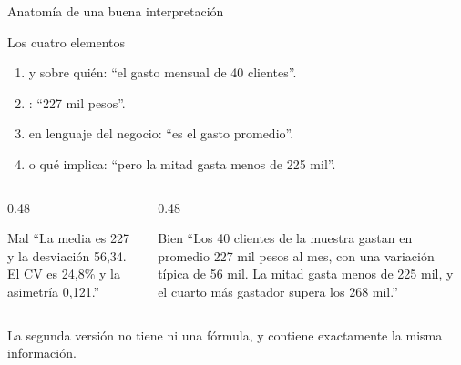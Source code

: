 \documentclass[aspectratio=169,10pt]{beamer}
\begin{document}

\begin{frame}{Anatomía de una buena interpretación}
  \footnotesize
  \begin{block}{Los cuatro elementos}
    \scriptsize
    \begin{enumerate}\setlength{\itemsep}{-0.03cm}
      \item {} y sobre quién: ``el gasto mensual de 40
            clientes''.
      \item {}: ``227 mil pesos''.
      \item {} en lenguaje del negocio: ``es el gasto
            promedio''.
      \item {} o qué implica: ``pero la mitad gasta
            menos de 225 mil''.
    \end{enumerate}
  \end{block}

  \vspace{0.1cm}
  \begin{columns}[T,onlytextwidth]
    \begin{column}{0.48\textwidth}
      \begin{alertblock}{Mal}
        \tiny
        ``La media es 227 y la desviación 56,34. El CV es 24,8\% y la
        asimetría 0,121.''
      \end{alertblock}
    \end{column}
    \begin{column}{0.48\textwidth}
      \begin{exampleblock}{Bien}
        \tiny
        ``Los 40 clientes de la muestra gastan en promedio 227 mil pesos al
        mes, con una variación típica de 56 mil. La mitad gasta menos de 225
        mil, y el cuarto más gastador supera los 268 mil.''
      \end{exampleblock}
    \end{column}
  \end{columns}

  \vspace{0.05cm}
  {\tiny\color{uniGris} La segunda versión no tiene ni una fórmula, y contiene
  exactamente la misma información.}
\end{frame}
\end{document}
